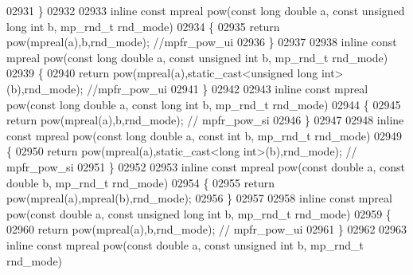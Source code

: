 \begin{DoxyCode}
{{02931 \}
02932 
02933 \textcolor{keyword}{inline} \textcolor{keyword}{const} mpreal pow(\textcolor{keyword}{const} \textcolor{keywordtype}{long} \textcolor{keywordtype}{double} a, \textcolor{keyword}{const} \textcolor{keywordtype}{unsigned} \textcolor{keywordtype}{long} \textcolor{keywordtype}{int} b, mp\_rnd\_t rnd\_mode)
02934 \{
02935     \textcolor{keywordflow}{return} pow(mpreal(a),b,rnd\_mode); \textcolor{comment}{//mpfr\_pow\_ui}
02936 \}
02937 
02938 \textcolor{keyword}{inline} \textcolor{keyword}{const} mpreal pow(\textcolor{keyword}{const} \textcolor{keywordtype}{long} \textcolor{keywordtype}{double} a, \textcolor{keyword}{const} \textcolor{keywordtype}{unsigned} \textcolor{keywordtype}{int} b, mp\_rnd\_t rnd\_mode)
02939 \{
02940     \textcolor{keywordflow}{return} pow(mpreal(a),static\_cast<unsigned long int>(b),rnd\_mode); \textcolor{comment}{//mpfr\_pow\_ui}
02941 \}
02942 
02943 \textcolor{keyword}{inline} \textcolor{keyword}{const} mpreal pow(\textcolor{keyword}{const} \textcolor{keywordtype}{long} \textcolor{keywordtype}{double} a, \textcolor{keyword}{const} \textcolor{keywordtype}{long} \textcolor{keywordtype}{int} b, mp\_rnd\_t rnd\_mode)
02944 \{
02945     \textcolor{keywordflow}{return} pow(mpreal(a),b,rnd\_mode); \textcolor{comment}{// mpfr\_pow\_si}
02946 \}
02947 
02948 \textcolor{keyword}{inline} \textcolor{keyword}{const} mpreal pow(\textcolor{keyword}{const} \textcolor{keywordtype}{long} \textcolor{keywordtype}{double} a, \textcolor{keyword}{const} \textcolor{keywordtype}{int} b, mp\_rnd\_t rnd\_mode)
02949 \{
02950     \textcolor{keywordflow}{return} pow(mpreal(a),static\_cast<long int>(b),rnd\_mode); \textcolor{comment}{// mpfr\_pow\_si}
02951 \}
02952 
02953 \textcolor{keyword}{inline} \textcolor{keyword}{const} mpreal pow(\textcolor{keyword}{const} \textcolor{keywordtype}{double} a, \textcolor{keyword}{const} \textcolor{keywordtype}{double} b, mp\_rnd\_t rnd\_mode)
02954 \{
02955     \textcolor{keywordflow}{return} pow(mpreal(a),mpreal(b),rnd\_mode);
02956 \}
02957 
02958 \textcolor{keyword}{inline} \textcolor{keyword}{const} mpreal pow(\textcolor{keyword}{const} \textcolor{keywordtype}{double} a, \textcolor{keyword}{const} \textcolor{keywordtype}{unsigned} \textcolor{keywordtype}{long} \textcolor{keywordtype}{int} b, mp\_rnd\_t rnd\_mode)
02959 \{
02960     \textcolor{keywordflow}{return} pow(mpreal(a),b,rnd\_mode); \textcolor{comment}{// mpfr\_pow\_ui}
02961 \}
02962 
02963 \textcolor{keyword}{inline} \textcolor{keyword}{const} mpreal pow(\textcolor{keyword}{const} \textcolor{keywordtype}{double} a, \textcolor{keyword}{const} \textcolor{keywordtype}{unsigned} \textcolor{keywordtype}{int} b, mp\_rnd\_t rnd\_mode)
}}
\end{DoxyCode}

